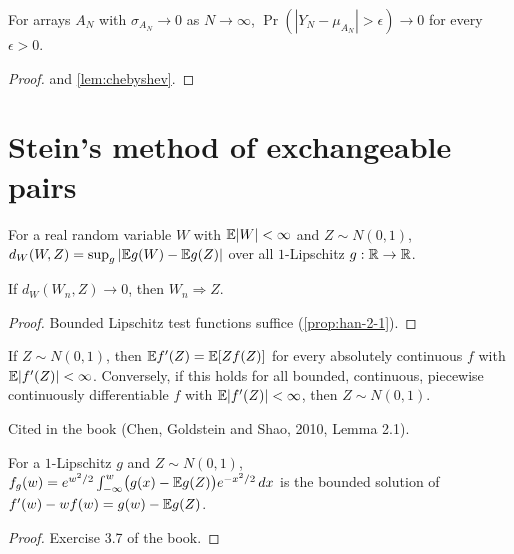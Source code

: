 \begin{corollary}
  \label{cor:han-3-1}
  For arrays $A_N$ with $\sigma_{A_N}\to0$ as $N\to\infty$, $\Pr(|Y_N-\mu_{A_N}|>\epsilon)\to0$ for every $\epsilon>0$.
\end{corollary}
\begin{proof}
   and \cref{lem:chebyshev}.
\end{proof}

\section{Stein's method of exchangeable pairs}

\begin{definition}
  \label{def:dw}
  For a real random variable $W$ with $\mathbb{E}|W|<\infty$ and $Z\sim N(0,1)$, $d_W(W,Z)=\sup_g|\mathbb{E} g(W)-\mathbb{E} g(Z)|$ over all $1$-Lipschitz $g:\mathbb{R}\to\mathbb{R}$.
\end{definition}

\begin{lemma}
  \label{lem:dw-weak}
  If $d_W(W_n,Z)\to0$, then $W_n\Rightarrow Z$.
\end{lemma}
\begin{proof}
  Bounded Lipschitz test functions suffice (\cref{prop:han-2-1}).
\end{proof}

\begin{lemma}
  \label{lem:han-3-2}
  If $Z\sim N(0,1)$, then $\mathbb{E} f'(Z)=\mathbb{E}[Zf(Z)]$ for every absolutely continuous $f$ with $\mathbb{E}|f'(Z)|<\infty$. Conversely, if this holds for all bounded, continuous, piecewise continuously differentiable $f$ with $\mathbb{E}|f'(Z)|<\infty$, then $Z\sim N(0,1)$.
\end{lemma}
\begin{remark}
  Cited in the book (Chen, Goldstein and Shao, 2010, Lemma 2.1).
\end{remark}

\begin{lemma}
  \label{lem:han-3-16}
  For a $1$-Lipschitz $g$ and $Z\sim N(0,1)$,
  $f_g(w)=e^{w^2/2}\int_{-\infty}^w\bigl(g(x)-\mathbb{E} g(Z)\bigr)e^{-x^2/2}\,dx$
  is the bounded solution of $f'(w)-wf(w)=g(w)-\mathbb{E} g(Z)$.
\end{lemma}
\begin{proof}
  Exercise 3.7 of the book.
\end{proof}

